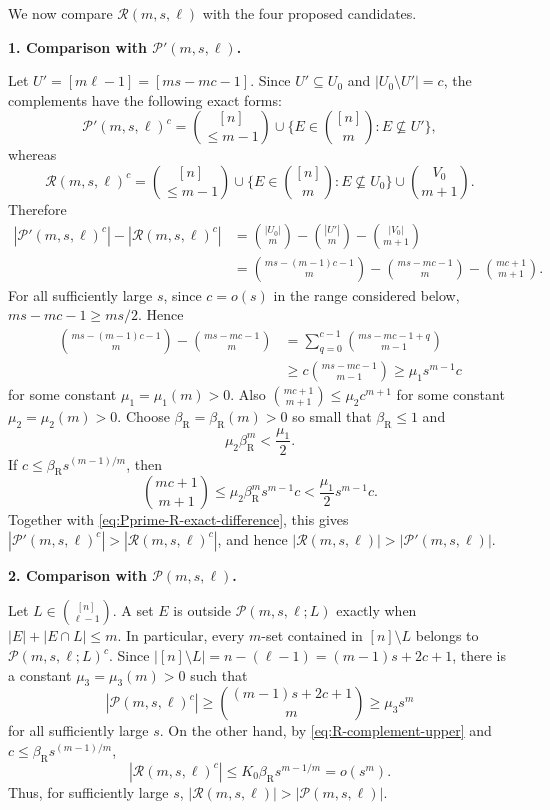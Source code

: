 \documentclass[10pt,a4paper]{article}
\numberwithin{equation}{section}
\theoremstyle{definition}
\begin{document}
We now compare $\mathcal R(m,s,\ell)$ with the four proposed candidates.

\medskip
\noindent\textbf{1. Comparison with $\mathcal P'(m,s,\ell)$.}
\medskip

Let $U'=[m\ell-1]=[ms-mc-1]$.
Since $U'\subseteq U_0$ and $|U_0\setminus U'|=c$, the complements have the following exact forms:
\[
        \mathcal P'(m,s,\ell)^c
        =\binom{[n]}{\le m-1}
        \cup\{E\in\binom{[n]}m:E\not\subseteq U'\},
\]
whereas
\[
        \mathcal R(m,s,\ell)^c
        =\binom{[n]}{\le m-1}
        \cup\{E\in\binom{[n]}m:E\not\subseteq U_0\}
        \cup\binom{V_0}{m+1}.
\]
Therefore
\begin{equation}\label{eq:Pprime-R-exact-difference}
        \begin{aligned}
                |\mathcal P'(m,s,\ell)^c|-|\mathcal R(m,s,\ell)^c|
                 & =\binom{|U_0|}{m}-\binom{|U'|}{m}-\binom{|V_0|}{m+1}          \\
                 & =\binom{ms-(m-1)c-1}{m}-\binom{ms-mc-1}{m}-\binom{mc+1}{m+1}.
        \end{aligned}
\end{equation}
For all sufficiently large $s$, since $c=o(s)$ in the range considered below, $ms-mc-1\ge ms/2$.
Hence
\[
        \begin{aligned}
                \binom{ms-(m-1)c-1}{m}-\binom{ms-mc-1}{m}
                 & =\sum_{q=0}^{c-1}\binom{ms-mc-1+q}{m-1} \\
                 & \ge c\binom{ms-mc-1}{m-1}
                \ge \mu_1s^{m-1}c
        \end{aligned}
\]
for some constant $\mu_1=\mu_1(m)>0$.
Also $\binom{mc+1}{m+1} \le \mu_2c^{m+1}$ for some constant $\mu_2=\mu_2(m)>0$.
Choose $\beta_{\mathrm R}=\beta_{\mathrm R}(m)>0$ so small that $\beta_{\mathrm R}\le1$ and
\[
        \mu_2\beta_{\mathrm R}^m<\frac{\mu_1}{2}.
\]
If $c\le\beta_{\mathrm R}s^{(m-1)/m}$, then
\[
        \binom{mc+1}{m+1}
        \le \mu_2\beta_{\mathrm R}^m s^{m-1}c
        <\frac{\mu_1}{2}s^{m-1}c.
\]
Together with \eqref{eq:Pprime-R-exact-difference}, this gives $|\mathcal P'(m,s,\ell)^c|>|\mathcal R(m,s,\ell)^c|$, and hence $|\mathcal R(m,s,\ell)|>|\mathcal P'(m,s,\ell)|$.

\medskip
\noindent\textbf{2. Comparison with $\mathcal P(m,s,\ell)$.}
\medskip

Let $L\in\binom{[n]}{\ell-1}$.
A set $E$ is outside $\mathcal P(m,s,\ell;L)$ exactly when $|E|+|E\cap L|\le m$.
In particular, every $m$-set contained in $[n]\setminus L$ belongs to $\mathcal P(m,s,\ell;L)^c$.
Since $|[n]\setminus L|=n-(\ell-1)=(m-1)s+2c+1$, there is a constant $\mu_3=\mu_3(m)>0$ such that
\[
        |\mathcal P(m,s,\ell)^c|
        \ge \binom{(m-1)s+2c+1}{m}
        \ge \mu_3s^m
\]
for all sufficiently large $s$.
On the other hand, by \eqref{eq:R-complement-upper} and $c\le\beta_{\mathrm R}s^{(m-1)/m}$,
\[
        |\mathcal R(m,s,\ell)^c|
        \le K_0\beta_{\mathrm R}s^{m-1/m}=o(s^m).
\]
Thus, for sufficiently large $s$, $|\mathcal R(m,s,\ell)|>|\mathcal P(m,s,\ell)|$.
\end{document}
